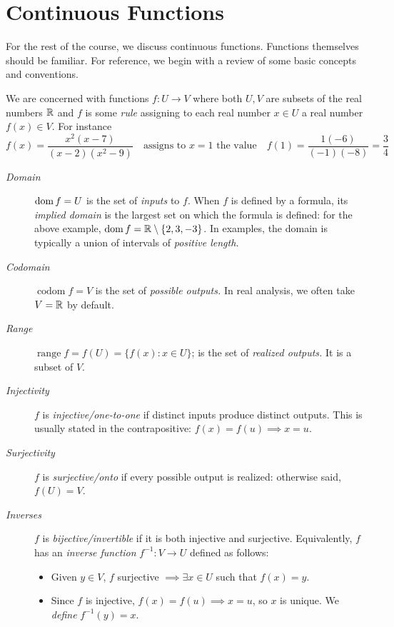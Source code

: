 \graphicspath{{4cont/asy/}}

\setcounter{section}{16}


\section{Continuous Functions}\label{sec:cont}

For the rest of the course, we discuss continuous functions. Functions themselves should be familiar. For reference, we begin with a review of some basic concepts and conventions.\medbreak


We are concerned with functions $f:U\to V$ where both $U,V$ are subsets of the real numbers $\mathbb{R}$ and $f$ is some \emph{rule} assigning to each real number $x\in U$ a real number $f(x)\in V$. For instance
\[f(x)=\frac {x^2(x-7)}{(x-2)(x^2-9)} \quad\text{assigns to $x=1$ the value}\quad f(1)=\frac{1(-6)}{(-1)(-8)}=\frac 34\]
\begin{description}%
	\item[\normalfont\emph{Domain}] $\operatorname{dom} f=U$ is the set of \emph{inputs} to $f$. When $f$ is defined by a formula, its \emph{implied domain} is the largest set on which the formula is defined: for the above example, $\operatorname{dom} f=\mathbb{R}\setminus\{2,3,-3\}$. In examples, the domain is typically a union of intervals of \emph{positive length.}
	\item[\normalfont\emph{Codomain}] $\operatorname{codom}f=V$ is the set of \emph{possible outputs.} In real analysis, we often take $V=\mathbb{R}$ by default.
	\item[\normalfont\emph{Range}] $\operatorname{range}f=f(U)=\{f(x):x\in U\}$; is the set of \emph{realized outputs.} It is a subset of $V$.
	\item[\normalfont\emph{Injectivity}] $f$ is \emph{injective/one-to-one} if distinct inputs produce distinct outputs. This is usually stated in the contrapositive: $f(x)=f(u)\implies x=u$.
	\item[\normalfont\emph{Surjectivity}] $f$ is \emph{surjective/onto} if every possible output is realized: otherwise said, $f(U)=V$.
	\item[\normalfont\emph{Inverses}] $f$ is \emph{bijective/invertible} if it is both injective and surjective. Equivalently, $f$ has an \emph{inverse function} $f^{-1}:V\to U$ defined as follows:
	\begin{itemize}
	  \item Given $y\in V$, $f$ surjective $\implies \exists x\in U$ such that $f(x)=y$.
	  \item Since $f$ is injective, $f(x)=f(u)\implies x=u$, so $x$ is unique. We \emph{define} $f^{-1}(y)=x$. 
	\end{itemize}
\end{description}

